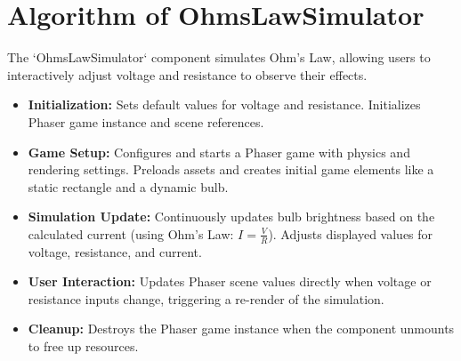 \section{Algorithm of OhmsLawSimulator}
The `OhmsLawSimulator` component simulates Ohm's Law, allowing users to interactively adjust voltage and resistance to observe their effects.
\begin{itemize}
    \item \textbf{Initialization:} Sets default values for voltage and resistance. Initializes Phaser game instance and scene references.
    \item \textbf{Game Setup:} Configures and starts a Phaser game with physics and rendering settings. Preloads assets and creates initial game elements like a static rectangle and a dynamic bulb.
    \item \textbf{Simulation Update:} Continuously updates bulb brightness based on the calculated current (using Ohm's Law: \( I = \frac{V}{R} \)). Adjusts displayed values for voltage, resistance, and current.
    \item \textbf{User Interaction:} Updates Phaser scene values directly when voltage or resistance inputs change, triggering a re-render of the simulation.
    \item \textbf{Cleanup:} Destroys the Phaser game instance when the component unmounts to free up resources.
\end{itemize}
